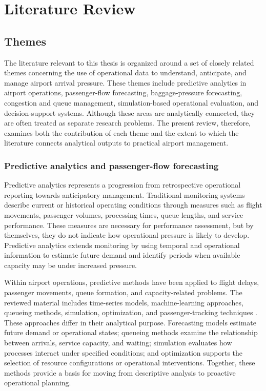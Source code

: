 \chapter{Literature Review}
\label{chap:literature-review}

\section{Themes}
\label{sec:literature-themes}

The literature relevant to this thesis is organized around a set of closely related themes concerning the use of operational data to understand, anticipate, and manage airport arrival pressure. These themes include predictive analytics in airport operations, passenger-flow forecasting, baggage-pressure forecasting, congestion and queue management, simulation-based operational evaluation, and decision-support systems. Although these areas are analytically connected, they are often treated as separate research problems. The present review, therefore, examines both the contribution of each theme and the extent to which the literature connects analytical outputs to practical airport management.

\subsection{Predictive analytics and passenger-flow forecasting}
\label{subsec:predictive-analytics-passenger-flow}

Predictive analytics represents a progression from retrospective operational reporting towards anticipatory management. Traditional monitoring systems describe current or historical operating conditions through measures such as flight movements, passenger volumes, processing times, queue lengths, and service performance. These measures are necessary for performance assessment, but by themselves, they do not indicate how operational pressure is likely to develop. Predictive analytics extends monitoring by using temporal and operational information to estimate future demand and identify periods when available capacity may be under increased pressure.

Within airport operations, predictive methods have been applied to flight delays, passenger movements, queue formation, and capacity-related problems. The reviewed material includes time-series models, machine-learning approaches, queueing methods, simulation, optimization, and passenger-tracking techniques \parencite{orsini2019neural,shao2019flight,zhang2021spatiotemporal,shao2022predicting,zhu2024spatiotemporal,pang2024machine}. These approaches differ in their analytical purpose. Forecasting models estimate future demand or operational states; queueing methods examine the relationship between arrivals, service capacity, and waiting; simulation evaluates how processes interact under specified conditions; and optimization supports the selection of resource configurations or operational interventions. Together, these methods provide a basis for moving from descriptive analysis to proactive operational planning.

